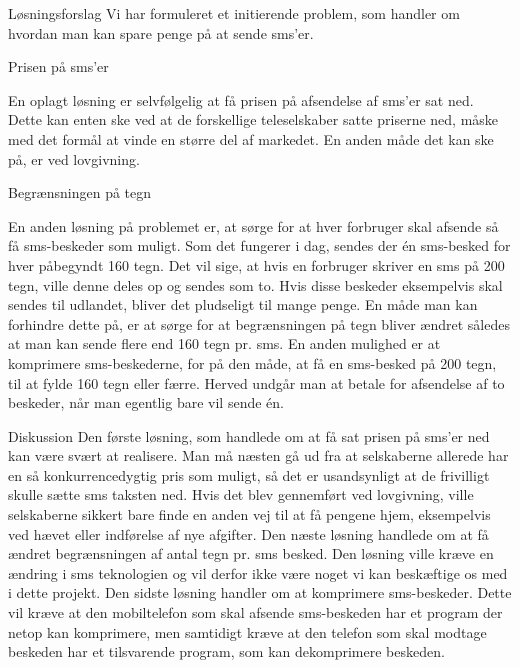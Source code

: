 Løsningsforslag
Vi har formuleret et initierende problem, som handler om hvordan man kan spare penge på at sende sms'er.

Prisen på sms'er

En oplagt løsning er selvfølgelig at få prisen på afsendelse af sms'er sat ned. Dette kan enten ske ved at de forskellige teleselskaber satte priserne ned, måske med det formål at vinde en større del af markedet. En anden måde det kan ske på, er ved lovgivning.

Begrænsningen på tegn

En anden løsning på problemet er, at sørge for at hver forbruger skal afsende så få sms-beskeder som muligt. Som det fungerer i dag, sendes der én sms-besked for hver påbegyndt 160 tegn. Det vil sige, at hvis en forbruger skriver en sms på 200 tegn, ville denne deles op og sendes som to. Hvis disse beskeder eksempelvis skal sendes til udlandet, bliver det pludseligt til mange penge.
En måde man kan forhindre dette på, er at sørge for at begrænsningen på tegn bliver ændret således at man kan sende flere end 160 tegn pr. sms.
En anden mulighed er at komprimere sms-beskederne, for på den måde, at få en sms-besked på 200 tegn, til at fylde 160 tegn eller færre. Herved undgår man at betale for afsendelse af to beskeder, når man egentlig bare vil sende én.
 
Diskussion
Den første løsning, som handlede om at få sat prisen på sms'er ned kan være svært at realisere. Man må næsten gå ud fra at selskaberne allerede har en så konkurrencedygtig pris som muligt, så det er usandsynligt at de frivilligt skulle sætte sms taksten ned. Hvis det blev gennemført ved lovgivning, ville selskaberne sikkert bare finde en anden vej til at få pengene hjem, eksempelvis ved hævet eller indførelse af nye afgifter.
Den næste løsning handlede om at få  ændret begrænsningen af antal tegn pr. sms besked. Den løsning ville kræve en ændring i sms teknologien og vil derfor ikke være noget vi kan beskæftige os med i dette projekt. Den sidste løsning handler om at komprimere sms-beskeder. Dette vil kræve at den mobiltelefon som skal afsende sms-beskeden har et program der netop kan komprimere, men samtidigt kræve at den telefon som skal modtage beskeden har et tilsvarende program, som kan dekomprimere beskeden.